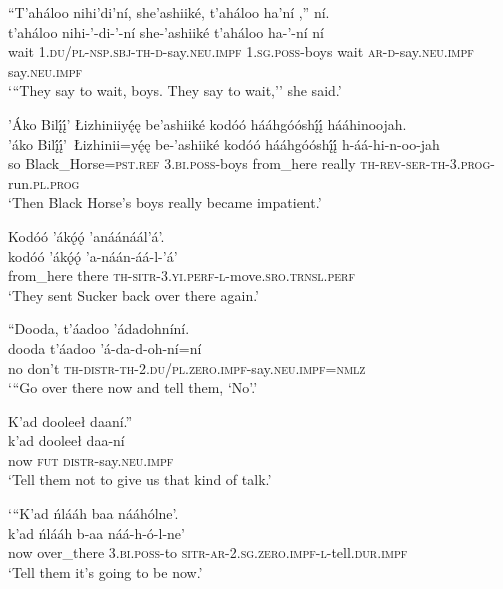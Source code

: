 \ea\label{ex:text1-51}
``T’aháloo nihi’di’ní, she’ashiiké, t’aháloo ha’ní ,'' ní.\\
\gll t’aháloo	nihi-’-di-’-ní	she-’ashiiké	t’aháloo	ha-’-ní	ní\\
     wait	1.\textsc{du}/\textsc{pl}-\textsc{nsp}.\textsc{sbj}-\textsc{th}-\textsc{d}-say.\textsc{neu}.\textsc{impf}	1.\textsc{sg}.\textsc{poss}-boys	wait	\textsc{ar}-\textsc{d}-say.\textsc{neu}.\textsc{impf}	say.\textsc{neu}.\textsc{impf}\\
\glt `{``}They say to wait, boys. They say to wait,'' she said.'
\z

\ea\label{ex:text1-52-1}
’Áko Bilį́į́’ Łizhiniiyę́ę be’ashiiké kodóó hááhgóóshį́į́ hááhinoojah.\\
\gll ’áko	Bilį́į́’~{Łizhinii=yę́ę}	be-’ashiiké	kodóó	hááhgóóshį́į́	h-áá-hi-n-oo-jah\\
     so	Black\_Horse=\textsc{pst}.\textsc{ref}	3.\textsc{bi}.\textsc{poss}-boys	from\_here	really	\textsc{th}-\textsc{rev}-\textsc{ser}-\textsc{th}-3.\textsc{prog}-run.\textsc{pl}.\textsc{prog}\\
\glt `Then Black Horse's boys really became impatient.'
\z

\ea\label{ex:text1-52-2}
Kodóó ’ákǫ́ǫ́ ’anáánáál’á’.\\
\gll kodóó	’ákǫ́ǫ́	’a-náán-áá-l-’á’\\
     from\_here	there	\textsc{th}-\textsc{sitr}-3.\textsc{yi}.\textsc{perf}-\textsc{l}-move.\textsc{sro}.\textsc{trnsl}.\textsc{perf}\\
\glt `They sent Sucker back over there again.'
\z

\ea\label{ex:text1-53-1}
``Dooda, t’áadoo ’ádadohníní.\\
\gll dooda	t’áadoo	’á-da-d-oh-ní=ní\\
     no	don’t	\textsc{th}-\textsc{distr}-\textsc{th}-2.\textsc{du}/\textsc{pl}.\textsc{zero}.\textsc{impf}-say.\textsc{neu}.\textsc{impf}=\textsc{nmlz}\\
\glt `{``}Go over there now and tell them, `No'.'
\z

\ea\label{ex:text1-53-2}
K’ad dooleeł daaní.''\\
\gll k’ad	dooleeł	daa-ní\\
     now	\textsc{fut}	\textsc{distr}-say.\textsc{neu}.\textsc{impf}\\
\glt `Tell them not to give us that kind of talk.'
\z

\ea\label{ex:text1-54-1}
`{``}K’ad ńlááh baa nááhólne’.\\
\gll k’ad	ńlááh	b-aa	náá-h-ó-l-ne’\\
     now	over\_there	3.\textsc{bi}.\textsc{poss}-to	\textsc{sitr}-\textsc{ar}-2.\textsc{sg}.\textsc{zero}.\textsc{impf}-\textsc{l}-tell.\textsc{dur}.\textsc{impf}\\
\glt `Tell them it's going to be now.'
\z

